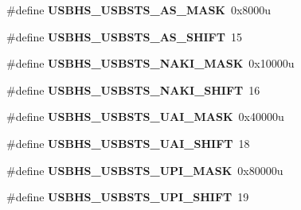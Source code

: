 \begin{DoxyCompactItemize}
\item 
\hypertarget{group___u_s_b_h_s___register___masks_ga9326e788caf0982d707364f9e1bc5050}{}\#define {\bfseries U\+S\+B\+H\+S\+\_\+\+U\+S\+B\+S\+T\+S\+\_\+\+A\+S\+\_\+\+M\+A\+S\+K}~0x8000u\label{group___u_s_b_h_s___register___masks_ga9326e788caf0982d707364f9e1bc5050}

\item 
\hypertarget{group___u_s_b_h_s___register___masks_ga470cc7e966d5af5aaddea3a16d4320b9}{}\#define {\bfseries U\+S\+B\+H\+S\+\_\+\+U\+S\+B\+S\+T\+S\+\_\+\+A\+S\+\_\+\+S\+H\+I\+F\+T}~15\label{group___u_s_b_h_s___register___masks_ga470cc7e966d5af5aaddea3a16d4320b9}

\item 
\hypertarget{group___u_s_b_h_s___register___masks_gad6803ef9a6369c9f6e3508aeb654a424}{}\#define {\bfseries U\+S\+B\+H\+S\+\_\+\+U\+S\+B\+S\+T\+S\+\_\+\+N\+A\+K\+I\+\_\+\+M\+A\+S\+K}~0x10000u\label{group___u_s_b_h_s___register___masks_gad6803ef9a6369c9f6e3508aeb654a424}

\item 
\hypertarget{group___u_s_b_h_s___register___masks_ga6411e1ec19f06fdf19869a7327707211}{}\#define {\bfseries U\+S\+B\+H\+S\+\_\+\+U\+S\+B\+S\+T\+S\+\_\+\+N\+A\+K\+I\+\_\+\+S\+H\+I\+F\+T}~16\label{group___u_s_b_h_s___register___masks_ga6411e1ec19f06fdf19869a7327707211}

\item 
\hypertarget{group___u_s_b_h_s___register___masks_ga8af40d0d10393da438e52993a3f965c6}{}\#define {\bfseries U\+S\+B\+H\+S\+\_\+\+U\+S\+B\+S\+T\+S\+\_\+\+U\+A\+I\+\_\+\+M\+A\+S\+K}~0x40000u\label{group___u_s_b_h_s___register___masks_ga8af40d0d10393da438e52993a3f965c6}

\item 
\hypertarget{group___u_s_b_h_s___register___masks_ga503698bd7243fd0a39d0724f18ee74d8}{}\#define {\bfseries U\+S\+B\+H\+S\+\_\+\+U\+S\+B\+S\+T\+S\+\_\+\+U\+A\+I\+\_\+\+S\+H\+I\+F\+T}~18\label{group___u_s_b_h_s___register___masks_ga503698bd7243fd0a39d0724f18ee74d8}

\item 
\hypertarget{group___u_s_b_h_s___register___masks_gac5cb82eaa64664b807144f86a1abf2bc}{}\#define {\bfseries U\+S\+B\+H\+S\+\_\+\+U\+S\+B\+S\+T\+S\+\_\+\+U\+P\+I\+\_\+\+M\+A\+S\+K}~0x80000u\label{group___u_s_b_h_s___register___masks_gac5cb82eaa64664b807144f86a1abf2bc}

\item 
\hypertarget{group___u_s_b_h_s___register___masks_gaccb735fb4a89ffd86ac87f29baeffcc9}{}\#define {\bfseries U\+S\+B\+H\+S\+\_\+\+U\+S\+B\+S\+T\+S\+\_\+\+U\+P\+I\+\_\+\+S\+H\+I\+F\+T}~19\label{group___u_s_b_h_s___register___masks_gaccb735fb4a89ffd86ac87f29baeffcc9}


\end{DoxyCompactItemize}

